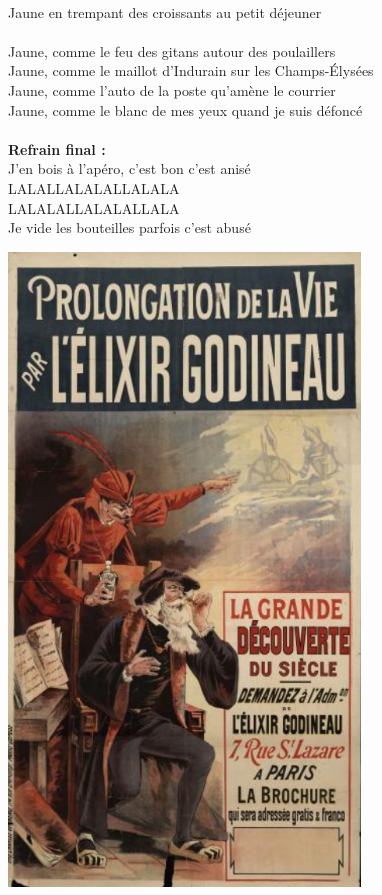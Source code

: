 \\Jaune en trempant des croissants au petit déjeuner
\\\\Jaune, comme le feu des gitans autour des poulaillers
\\Jaune, comme le maillot d'Indurain sur les Champs-Élysées
\\Jaune, comme l'auto de la poste qu'amène le courrier
\\Jaune, comme le blanc de mes yeux quand je suis défoncé
\\\\\textbf{Refrain final :}
\\J'en bois à l'apéro, c'est bon c'est anisé
\\LALALLALALALLALALA
\\LALALALLALALALLALA
\\Je vide les bouteilles parfois c'est abusé
\bigskip
\bigskip
\bigskip
\begin{center}
\includegraphics[width=0.7\textwidth]{images/brev77.png}
\end{center}
\breakpage